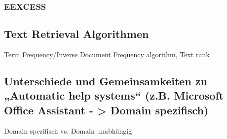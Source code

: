  	\subsubsection{EEXCESS}

\subsection{Text Retrieval Algorithmen}
 		Term Frequency/Inverse Document Frequency algorithm,
 		Text rank
 \subsection{Unterschiede und Gemeinsamkeiten zu „Automatic help systems“ (z.B. Microsoft Office Assistant - > Domain spezifisch)}
 	Domain spezifisch vs. Domain unabhängig